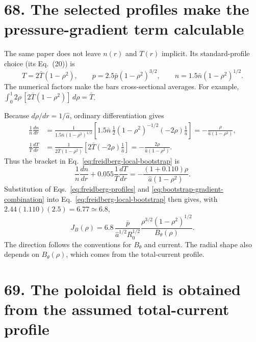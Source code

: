 \documentclass[11pt]{article}
\begin{document}
\section*{68. The selected profiles make the pressure-gradient term calculable}

The same paper does not leave $n(r)$ and $T(r)$ implicit. Its standard-profile choice
(its Eq.~(20)) is
\begin{equation}
 T=2\bar T(1-\rho^2),\qquad
 p=2.5\bar p(1-\rho^2)^{3/2},\qquad
 n=1.5\bar n(1-\rho^2)^{1/2}.
 \label{eq:freidberg-profiles}
\end{equation}
The numerical factors make the bars cross-sectional averages. For example,
$\int_0^1 2\rho\,[2\bar T(1-\rho^2)]\,d\rho=\bar T$.

Because $d\rho/dr=1/\hat a$, ordinary differentiation gives
\begin{align}
 \frac1n\frac{dn}{dr}
 &=\frac{1}{1.5\bar n(1-\rho^2)^{1/2}}
 \left[1.5\bar n\,\frac12(1-\rho^2)^{-1/2}
       \left(-2\rho\right)\frac1{\hat a}\right]
 =-\frac{\rho}{\hat a(1-\rho^2)},\\
 \frac1T\frac{dT}{dr}
 &=\frac{1}{2\bar T(1-\rho^2)}
 \left[2\bar T\left(-2\rho\right)\frac1{\hat a}\right]
 =-\frac{2\rho}{\hat a(1-\rho^2)}.
 \label{eq:profile-log-gradients}
\end{align}
Thus the bracket in Eq.~\eqref{eq:freidberg-local-bootstrap} is
\begin{equation}
 \frac1n\frac{dn}{dr}+0.055\frac1T\frac{dT}{dr}
 =-\frac{(1+0.110)\rho}{\hat a(1-\rho^2)}.
 \label{eq:bootstrap-gradient-combination}
\end{equation}
Substitution of Eqs.~\eqref{eq:freidberg-profiles} and
\eqref{eq:bootstrap-gradient-combination} into Eq.~\eqref{eq:freidberg-local-bootstrap}
then gives, with $2.44(1.110)(2.5)=6.77\simeq6.8$,
\begin{equation}
 J_B(\rho)=6.8\,\frac{\bar p}{\hat a^{1/2}R_0^{1/2}}
 \frac{\rho^{3/2}(1-\rho^2)^{1/2}}{B_\theta(\rho)}.
 \label{eq:bootstrap-profiled-current}
\end{equation}
The direction follows the conventions for $B_\theta$ and current. The radial shape
also depends on $B_\theta(\rho)$, which comes from the total-current profile.

\section*{69. The poloidal field is obtained from the assumed total-current profile}
\end{document}
